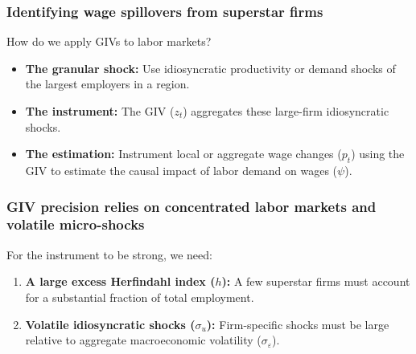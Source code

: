 \documentclass[aspectratio=169,11pt]{beamer}
\begin{document}
\begin{frame}
\frametitle{Identifying wage spillovers from superstar firms}

\vspace{0.5cm}
{\Large
How do we apply GIVs to labor markets?
}

\vspace{1cm}
\begin{itemize}
    \item \textbf{The granular shock:} Use idiosyncratic productivity or demand shocks of the largest employers in a region.
    \item \textbf{The instrument:} The GIV ($z_t$) aggregates these large-firm idiosyncratic shocks.
    \item \textbf{The estimation:} Instrument local or aggregate wage changes ($p_t$) using the GIV to estimate the causal impact of labor demand on wages ($\psi$).
\end{itemize}

\end{frame}

\begin{frame}
\frametitle{GIV precision relies on concentrated labor markets and volatile micro-shocks}

\vspace{0.5cm}
{\Large
For the instrument to be strong, we need:
}

\vspace{1cm}
\begin{enumerate}
    \item \textbf{A large excess Herfindahl index ($h$):} A few superstar firms must account for a substantial fraction of total employment.
    \vspace{0.5cm}
    \item \textbf{Volatile idiosyncratic shocks ($\sigma_u$):} Firm-specific shocks must be large relative to aggregate macroeconomic volatility ($\sigma_\varepsilon$).
\end{enumerate}

\end{frame}
\end{document}
